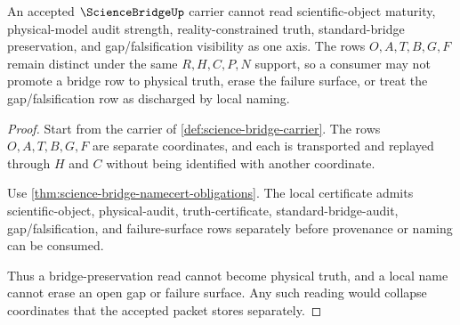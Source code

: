 \begin{theorem}
\label{thm:science-bridge-axis-separation}
An accepted $\ScienceBridgeUp$ carrier cannot read scientific-object maturity, physical-model audit strength, reality-constrained truth, standard-bridge preservation, and gap/falsification visibility as one axis. The rows $O,A,T,B,G,F$ remain distinct under the same $R,H,C,P,N$ support, so a consumer may not promote a bridge row to physical truth, erase the failure surface, or treat the gap/falsification row as discharged by local naming.
\end{theorem}
\begin{proof}
Start from the carrier of \autoref{def:science-bridge-carrier}. The rows $O,A,T,B,G,F$ are separate coordinates, and each is transported and replayed through $H$ and $C$ without being identified with another coordinate.

Use \autoref{thm:science-bridge-namecert-obligations}. The local certificate admits scientific-object, physical-audit, truth-certificate, standard-bridge-audit, gap/falsification, and failure-surface rows separately before provenance or naming can be consumed.

Thus a bridge-preservation read cannot become physical truth, and a local name cannot erase an open gap or failure surface. Any such reading would collapse coordinates that the accepted packet stores separately.
\end{proof}

